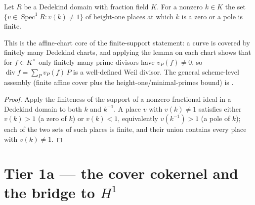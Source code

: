 \begin{lemma}
  \label{thm:adelic_finite_support_order}
  \leanok
  Let \(R\) be a Dedekind domain with fraction field \(K\). For a nonzero
  \(k \in K\) the set \(\{ v \in \operatorname{Spec}^1 R : v(k) \ne 1\}\) of
  height-one places at which \(k\) is a zero or a pole is finite.

  This is the affine-chart core of the finite-support statement: a curve is
  covered by finitely many Dedekind charts, and applying the lemma on each
  chart shows that for \(f \in K^\times\) only finitely many prime divisors
  have \(v_P(f) \ne 0\), so \(\operatorname{div} f = \sum_P v_P(f)\,P\) is a
  well-defined Weil divisor. The general scheme-level assembly (finite affine
  cover plus the height-one/minimal-primes bound) is
  .
\end{lemma}
\begin{proof}
  \leanok
  Apply the finiteness of the support of a nonzero fractional ideal in a
  Dedekind domain to both \(k\) and \(k^{-1}\). A place \(v\) with
  \(v(k) \ne 1\) satisfies either \(v(k) > 1\) (a zero of \(k\)) or
  \(v(k) < 1\), equivalently \(v(k^{-1}) > 1\) (a pole of \(k\)); each of
  the two sets of such places is finite, and their union contains every
  place with \(v(k) \ne 1\).
\end{proof}

\section{Tier 1a --- the cover cokernel and the bridge to \(H^1\)}
\label{sec:RiemannRoch_Adelic_cokernel}

